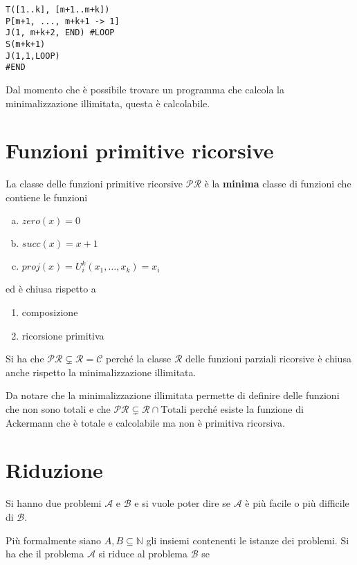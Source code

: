 \begin{lstlisting}[language=URM]
T([1..k], [m+1..m+k])
P[m+1, ..., m+k+1 -> 1]
J(1, m+k+2, END) #LOOP
S(m+k+1)
J(1,1,LOOP)
#END
\end{lstlisting}

Dal momento che è possibile trovare un programma che calcola la minimalizzazione illimitata, questa è calcolabile.

\section{Funzioni primitive ricorsive}

La classe delle funzioni primitive ricorsive $\mathcal{PR}$ è la \textbf{minima} classe di funzioni che contiene le funzioni

\begin{enumerate}[(a)]
	\item $zero(x) = 0$
	\item $succ(x) = x+1$
	\item $proj(x) = U_{i}^{k}(x_1, \ldots, x_k) = x_i$
\end{enumerate}

ed è chiusa rispetto a 

\begin{enumerate}
	\item composizione
	\item ricorsione primitiva
\end{enumerate}

Si ha che $\mathcal{PR} \subsetneq \mathcal{R} = \mathcal{C}$ perché la classe $\mathcal{R}$ delle funzioni parziali ricorsive è chiusa anche rispetto la minimalizzazione illimitata.

Da notare che la minimalizzazione illimitata permette di definire delle funzioni che non sono totali e che $\mathcal{PR} \subsetneq \mathcal{R} \cap \text{Totali}$ perché esiste la funzione di Ackermann che è totale e calcolabile ma non è primitiva ricorsiva.

\section{Riduzione}

Si hanno due problemi $\mathcal{A}$ e $\mathcal{B}$ e si vuole poter dire se $\mathcal{A}$ è più facile o più difficile di $\mathcal{B}$.

Più formalmente siano $A,B \subseteq \mathbb{N}$ gli insiemi contenenti le istanze dei problemi. Si ha che il problema $\mathcal{A}$ si riduce al problema $\mathcal{B}$ se 

